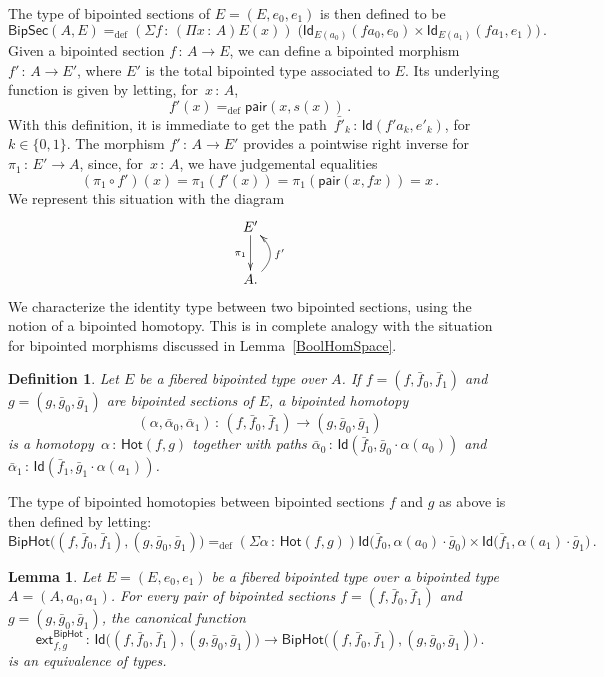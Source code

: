 \documentclass[10pt,a4paper,oneside,reqno]{amsart}
\numberwithin{equation}{section}
\theoremstyle{mythm}
\newtheorem{lemma}[theorem]{Lemma}
\theoremstyle{mydef}
\newtheorem{definition}[theorem]{Definition}
\theoremstyle{myrmk}
\newcommand{\deq}{=}
\newcommand{\defeq}{=_{\mathrm{def}}}
\newcommand{\co}{\,{:}\,}
\newcommand{\ct}{\cdot}
\newcommand{\Hot}{\mathsf{Hot}}
\newcommand{\ext}{\mathsf{ext}}
\newcommand{\Id}{\mathsf{Id}}
\newcommand{\pair}{\mathsf{pair}}
\newcommand{\BipHot}{\mathsf{BipHot}}
\newcommand{\BipSec}{\mathsf{BipSec}}
\begin{document}
The type of bipointed sections of $E = (E, e_0, e_1)$ is then defined to be
\[
\BipSec(A,E) \defeq (\Sigma f \co (\Pi x \co A)E(x) ) \; \big(
  \Id_{E(a_0)}(f a_0,  e_0)  \times \Id_{E(a_1)}( fa_1, e_1)  \big) \, .
\]
Given a bipointed section $f \co A \to E$, we can define a bipointed morphism~$f'  \co A \to E'$, where $E'$ is the
total bipointed type associated to $E$. Its underlying function is given by 
letting,  for~$x \co A$, 
\[
f'(x) \defeq \pair(x, s(x)) \, .
\] 
With this definition, it is 
immediate to get the path~$\bar{f'}_k \co \Id( f' a_k ,  e'_k)$, for $k \in \{ 0, 1\}$.
The morphism $f' \co A \to E'$ provides a pointwise right inverse for~$\pi_1 \co E' \to A$,
 since, for~$x \co A$, we have judgemental equalities
\[
 (\pi_1 \circ f')(x) \deq \pi_1 (f'(x)) \deq \pi_1 (\pair(x, f x)) \deq x \, .
\]
 We represent this situation with the diagram
\[
\xymatrix{
E' \ar[d]_{\pi_1} \\
A . \ar@/_1.2pc/[u]_{f'} }
\]
We characterize the identity type between two bipointed sections, using
the notion of a bipointed homotopy. This is in complete analogy with the situation for bipointed
morphisms discussed in Lemma~\ref{BoolHomSpace}. 


\begin{definition} \label{def:2cellsection} Let $E$ be a fibered bipointed type over $A$. If $f = (f, \bar{f}_0,\bar{f}_1)$ and $g = (g, \bar{g}_0, \bar{g}_1)$ are bipointed sections of $E$, a \emph{bipointed homotopy} 
\[
(\alpha, \bar{\alpha}_0, \bar{\alpha}_1) \co (f, \bar{f}_0, \bar{f}_1)  \rightarrow (g, \bar{g}_0, \bar{g}_1)
\]
is a homotopy~$\alpha \co \Hot(f, g)$ together with paths $\bar{\alpha}_0 \co \Id(  \bar{f}_0 ,  \bar{g}_0 \ct \alpha(a_0)  )$ and $\bar{\alpha}_1 \co \Id(
\bar{f}_1 , \bar{g}_1 \ct  \alpha(a_1))$.
\end{definition} 



The type of bipointed homotopies between bipointed sections $f$ and $g$ as above is then defined by letting:
\[
\BipHot \big( (f, \bar{f}_0, \bar{f}_1), (g, \bar{g}_0, \bar{g}_1) \big) \defeq
(\Sigma \alpha \co \Hot( f, g)) 
\Id\big( \bar{f}_0 ,  \alpha(a_0)  \ct \bar{g}_0 \big) \times 
  \Id \big( \bar{f}_1,  \alpha(a_1) \ct  \bar{g}_1 \big) 
 \, .
\]


\begin{lemma} \label{thm:biphot}
Let $E = (E, e_0, e_1)$ be a fibered bipointed type over a bipointed type $A = (A, a_0, a_1)$. 
For every pair of bipointed sections $f = (f, \bar{f}_0, \bar{f}_1)$ and $g = (g, \bar{g}_0, \bar{g}_1)$, 
the canonical function
\[
\ext^{\BipHot}_{f,g} \co \Id\big( (f, \bar{f}_0, \bar{f}_1), (g, \bar{g}_0, \bar{g}_1) \big) \rightarrow
\BipHot \big( (f, \bar{f}_0, \bar{f}_1), (g, \bar{g}_0, \bar{g}_1) \big) \, .
\]
is an equivalence of types. 
\end{lemma}
\end{document}
